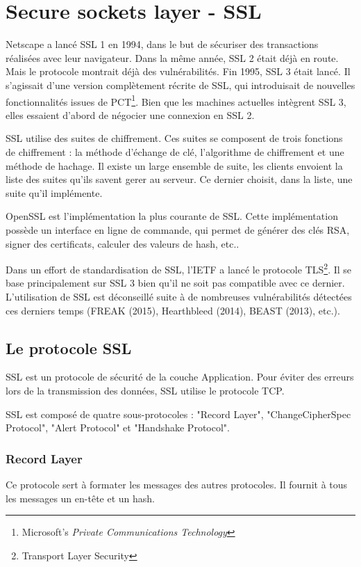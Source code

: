 \section{Secure sockets layer - SSL}
Netscape a lancé SSL 1 en 1994, dans le but de sécuriser des transactions réalisées avec leur navigateur. 
Dans la même année, SSL 2 était déjà en route. 
Mais le protocole montrait déjà des vulnérabilités.
Fin 1995, SSL 3 était lancé. 
Il s'agissait d'une version complètement récrite de SSL, qui introduisait de nouvelles fonctionnalités issues de PCT\footnote{Microsoft's \textit{Private Communications Technology}}.
Bien que les machines actuelles intègrent SSL 3, elles essaient d'abord de négocier une connexion en SSL 2.

SSL utilise des suites de chiffrement. 
Ces suites se composent de trois fonctions de chiffrement : la méthode d'échange de clé, l'algorithme de chiffrement et une méthode de hachage. 
Il existe un large ensemble de suite, les clients envoient la liste des suites qu'ils savent gerer au serveur. 
Ce dernier choisit, dans la liste, une suite qu'il implémente. 

OpenSSL est l'implémentation la plus courante de SSL. 
Cette implémentation possède un interface en ligne de commande, qui permet de générer des clés RSA, signer des certificats, calculer des valeurs de hash, etc..

Dans un effort de standardisation de SSL, l'IETF a lancé le protocole TLS\footnote{Transport Layer Security}.
Il se base principalement sur SSL 3 bien qu'il ne soit pas compatible avec ce dernier.
L'utilisation de SSL est déconseillé suite à de nombreuses vulnérabilités détectées ces derniers temps (FREAK (2015), Hearthbleed (2014), BEAST (2013), etc.).

\subsection{Le protocole SSL}
SSL est un protocole de sécurité de la couche Application. 
Pour éviter des erreurs lors de la transmission des données, SSL utilise le protocole TCP.

SSL est composé de quatre sous-protocoles : "Record Layer", "ChangeCipherSpec Protocol", "Alert Protocol" et "Handshake Protocol".

\subsubsection{Record Layer}
Ce protocole sert à formater les messages des autres protocoles.
Il fournit à tous les messages un en-tête et un hash.

